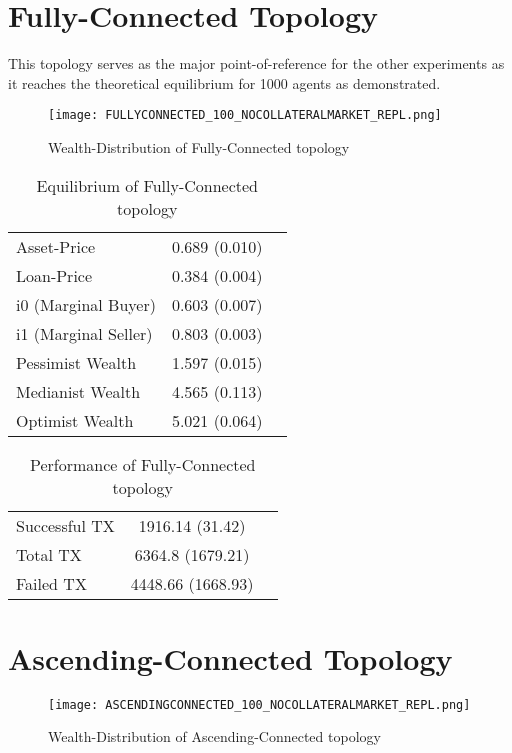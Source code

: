 \documentclass[Bachelorarbeit.tex]{subfiles}
\begin{document}
\section{Fully-Connected Topology}
This topology serves as the major point-of-reference for the other experiments as it reaches the theoretical equilibrium for 1000 agents as demonstrated.

\begin{figure}[H]
	\centering
  \texttt{[image: FULLYCONNECTED\_100\_NOCOLLATERALMARKET\_REPL.png]}
	\caption{Wealth-Distribution of Fully-Connected topology}
	\label{fig:wealth_FULLYCONNECTED_100_NOCOLLATERALMARKET_REPL}
\end{figure}

\begin{table}[h]
	\caption{Equilibrium of Fully-Connected topology}
	\centering
	\begin{tabular} { l c r }
		\hline
		Asset-Price & 0.689 (0.010) \\
		Loan-Price & 0.384 (0.004) \\
		i0 (Marginal Buyer) & 0.603 (0.007) \\
		i1 (Marginal Seller) & 0.803 (0.003) \\
		Pessimist Wealth & 1.597 (0.015) \\
		Medianist Wealth & 4.565 (0.113) \\
		Optimist Wealth & 5.021 (0.064) \\
		\hline
	\end{tabular}
\end{table} 

\begin{table}[h]
	\caption{Performance of Fully-Connected topology}
	\centering
	\begin{tabular} { l c r }
		\hline
		Successful TX & 1916.14 (31.42) \\
		Total TX & 6364.8 (1679.21) \\
		Failed TX & 4448.66 (1668.93) \\
		\hline
	\end{tabular}
\end{table}


\section{Ascending-Connected Topology} 

\begin{figure}[H]
	\centering
  \texttt{[image: ASCENDINGCONNECTED\_100\_NOCOLLATERALMARKET\_REPL.png]}
	\caption{Wealth-Distribution of Ascending-Connected topology}
	\label{fig:wealth_ASCENDINGCONNECTED_100_NOCOLLATERALMARKET_REPL}
\end{figure}
\end{document}
